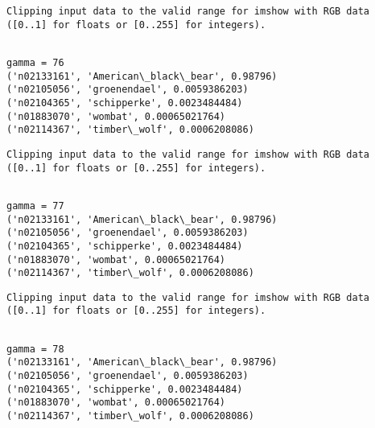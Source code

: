 \documentclass[11pt]{article}
\begin{document}
    \begin{Verbatim}[commandchars=\\\{\}]
Clipping input data to the valid range for imshow with RGB data ([0..1] for floats or [0..255] for integers).

    \end{Verbatim}

    \begin{Verbatim}[commandchars=\\\{\}]

gamma = 76
('n02133161', 'American\_black\_bear', 0.98796)
('n02105056', 'groenendael', 0.0059386203)
('n02104365', 'schipperke', 0.0023484484)
('n01883070', 'wombat', 0.00065021764)
('n02114367', 'timber\_wolf', 0.0006208086)

    \end{Verbatim}

    \begin{Verbatim}[commandchars=\\\{\}]
Clipping input data to the valid range for imshow with RGB data ([0..1] for floats or [0..255] for integers).

    \end{Verbatim}

    \begin{Verbatim}[commandchars=\\\{\}]

gamma = 77
('n02133161', 'American\_black\_bear', 0.98796)
('n02105056', 'groenendael', 0.0059386203)
('n02104365', 'schipperke', 0.0023484484)
('n01883070', 'wombat', 0.00065021764)
('n02114367', 'timber\_wolf', 0.0006208086)

    \end{Verbatim}

    \begin{Verbatim}[commandchars=\\\{\}]
Clipping input data to the valid range for imshow with RGB data ([0..1] for floats or [0..255] for integers).

    \end{Verbatim}

    \begin{Verbatim}[commandchars=\\\{\}]

gamma = 78
('n02133161', 'American\_black\_bear', 0.98796)
('n02105056', 'groenendael', 0.0059386203)
('n02104365', 'schipperke', 0.0023484484)
('n01883070', 'wombat', 0.00065021764)
('n02114367', 'timber\_wolf', 0.0006208086)

    \end{Verbatim}
\end{document}
